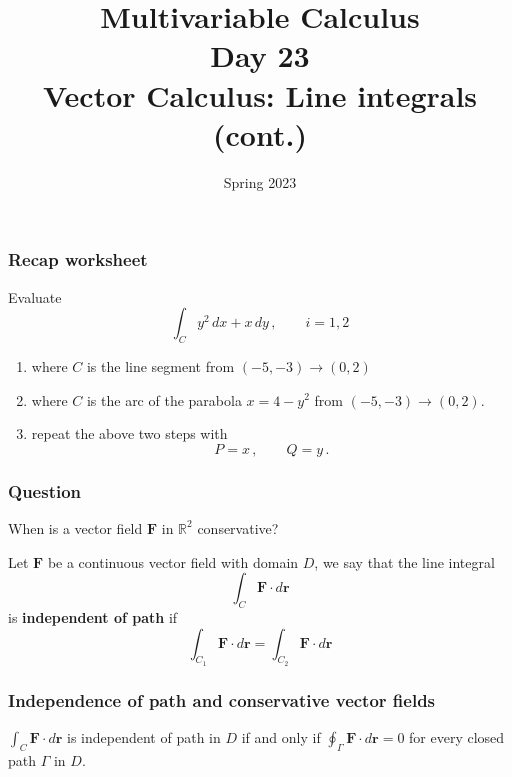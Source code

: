 \documentclass[aspectratio=169]{beamer}
\title{ Multivariable Calculus \\ Day  23 \\ Vector Calculus: Line integrals (cont.)}
\date{Spring 2023}
\newcommand{\vect}{\mathbf}
\newcommand{\R}{\mathbb{R}}
\begin{document}
\maketitle


\begin{frame}
    \frametitle{Recap worksheet}
    Evaluate
    \begin{equation*}
        \int_{C} y^2 \, dx + x\, dy \,, \qquad i = 1,2
    \end{equation*}
    \begin{enumerate}
        \item where \(C\) is the line segment from \((-5,-3) \to (0,2)\) 
        \item where \(C\) is the arc of the parabola \(x = 4-y^2\) from \((-5,-3) \to (0,2)\).
        \item repeat the above two steps with 
            \begin{equation*}
                P = x\,, \qquad Q = y \,.
            \end{equation*}
    \end{enumerate}
\end{frame}


\begin{frame}
    \frametitle{Question}
    When is a vector field $\vect{F}$ in $\R^2$ conservative?
\end{frame}


\begin{frame}
\begin{definition}
Let \(\mathbf{F}\) be a continuous vector field with domain \(D\), we say that the
line integral
\begin{equation*}
    \int_C \mathbf{F} \cdot d\mathbf{r} 
\end{equation*}
is \textbf{independent of path} if
\begin{equation*}
    \int_{C_1} \mathbf{F}\cdot d\mathbf{r} 
    =
    \int_{C_2} \mathbf{F} \cdot d\mathbf{r} 
\end{equation*}
\end{definition}
\end{frame}


\begin{frame}
    \frametitle{Independence of path and conservative vector fields}
    \begin{theorem}
    \(\int_C \mathbf{F}\cdot d\mathbf{r}\) is independent of path in \(D\) if and only if
    \(\oint_\Gamma \mathbf{F} \cdot d\mathbf{r} = 0\) for every closed path \(\Gamma \) in \(D\).
    \end{theorem}
\end{frame}
\end{document}
